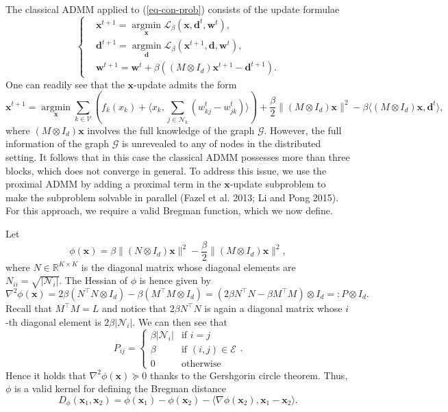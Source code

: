 \documentclass[
  letterpaper,
  DIV=11,
  numbers=noendperiod]{scrartcl}
\theoremstyle{plain}
\theoremstyle{remark}
\begin{document}
The classical ADMM applied to (\ref{eq-con-prob}) consists of the update
formulae \[
\left\{
  \begin{aligned}
    & \mathbf{x}^{t+1} = \operatorname*{argmin}_{\mathbf{x}} \mathcal{L}_{\beta}(\mathbf{x}, \mathbf{d}^t, \mathbf{w}^t), \\
    & \mathbf{d}^{t+1} = \operatorname*{argmin}_{\mathbf{d}} \mathcal{L}_{\beta}(\mathbf{x}^{t+1}, \mathbf{d}, \mathbf{w}^t), \\
    & \mathbf{w}^{t+1} = \mathbf{w}^t + \beta ((M \otimes I_d) \mathbf{x}^{t+1} - \mathbf{d}^{t+1}).
  \end{aligned}
\right.
\] One can readily see that the \(\mathbf{x}\)-update admits the form \[
  \mathbf{x}^{t+1} \!=\! \operatorname*{argmin}_{\mathbf{x}} \sum_{k \in \mathcal{V}} (f_k(x_k) + \langle x_k, \sum_{j \in \mathcal{N}_k} (w_{kj}^t - w_{jk}^t) \rangle) + \frac{\beta}{2} \| (M \otimes I_d) \mathbf{x} \|^2 - \beta \langle (M \otimes I_d) \mathbf{x}, \mathbf{d}^t \rangle,
\] where \((M\otimes I_d)\mathbf{x}\) involves the full knowledge of the
graph \(\mathcal{G}\). However, the full information of the graph
\(\mathcal{G}\) is unrevealed to any of nodes in the distributed
setting. It follows that in this case the classical ADMM possesses more
than three blocks, which does not converge in general. To address this
issue, we use the proximal ADMM by adding a proximal term in the
\(\mathbf{x}\)-update subproblem to make the subproblem solvable in
parallel (Fazel et al. 2013; Li and Pong 2015). For this approach, we
require a valid Bregman function, which we now define.

Let \[
\phi(\mathbf{x}) = \beta \| (N \otimes I_d) \mathbf{x} \|^2 - \frac{\beta}{2} \| (M \otimes I_d) \mathbf{x} \|^2,
\] where \(N \in \mathbb{R}^{K \times K}\) is the diagonal matrix whose
diagonal elements are \(N_{ii} = \sqrt{| \mathcal{N}_i |}\). The Hessian
of \(\phi\) is hence given by \[
\nabla ^2 \phi(\mathbf{x}) = 2\beta (N^{\top}N \otimes I_d ) - \beta (M^{\top}M \otimes I_d) = (2\beta N^{\top}N - \beta M^{\top}M ) \otimes I_d =: P \otimes I_d.
\] Recall that \(M^{\top}M = L\) and notice that \(2\beta N^{\top}N\) is
again a diagonal matrix whose \(i\)-th diagonal element is
\(2\beta| \mathcal{N}_i |\). We can then see that \[
P_{ij} =
\begin{cases}
  \beta | \mathcal{N}_i | & \text{if } i = j \\
  \beta & \text{if } (i, j) \in \mathcal{E} \\
  0 & \text{otherwise}
\end{cases}.
\] Hence it holds that \(\nabla ^2 \phi (\mathbf{x}) \succeq 0\) thanks
to the Gershgorin circle theorem. Thus, \(\phi\) is a valid kernel for
defining the Bregman distance \[
D_{\phi}(\mathbf{x}_1, \mathbf{x}_2) = \phi(\mathbf{x}_1) - \phi(\mathbf{x}_2) - \langle \nabla \phi(\mathbf{x}_2), \mathbf{x}_1 - \mathbf{x}_2 \rangle.
\]
\end{document}
